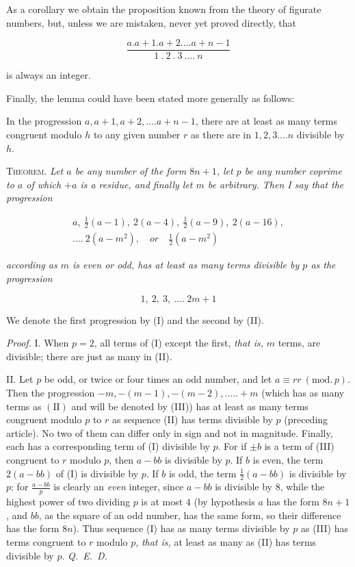 As a corollary we obtain the proposition known from the theory of figurate numbers, but, unless we are mistaken, never yet proved directly, that

\[
\frac{a.a+1.a+2....a+n-1}{1\ .\ 2\ .\ 3\ ....\ n}
\]

is always an integer.

Finally, the lemma could have been stated more generally as follows:

In the progression $a,a+1,a+2,....a+n-1$, there are at least as many terms congruent modulo $h$ to any given number $r$ as there are in $1,2,3....n$ divisible by $h$.

\textsc{Theorem.} \textit{Let $a$ be any number of the form $8n+1$, let $p$ be any number coprime to $a$ of which $+a$ is a residue, and finally let $m$ be arbitrary. Then I say that the progression}

\[
\begin{gathered}a,\ \tfrac12(a-1),\ 2(a-4),\ \tfrac12(a-9),\ 2(a-16),\\ ....\ 2(a-m^2),\quad\textit{or}\quad\tfrac12(a-m^2)\end{gathered}
\]

\textit{according as $m$ is even or odd, has at least as many terms divisible by $p$ as the progression}

\[
1,\ 2,\ 3,\ ....\ 2m+1
\]

We denote the first progression by (I) and the second by (II).

\textit{Proof.} I. When $p=2$, all terms of (I) except the first, \textit{that is,} $m$ terms, are divisible; there are just as many in (II).

II. Let $p$ be odd, or twice or four times an odd number, and let $a\equiv rr\ (\mathrm{mod.}\,p)$. Then the progression $-m,-(m-1),-(m-2),.....+m$ (which has as many terms as $(\mathrm{II})$ and will be denoted by (III)) has at least as many terms congruent modulo $p$ to $r$ as sequence (II) has terms divisible by $p$ (preceding article). No two of them can differ only in sign and not in magnitude. Finally, each has a corresponding term of (I) divisible by $p$. For if $\pm b$ is a term of (III) congruent to $r$ modulo $p$, then $a-bb$ is divisible by $p$. If $b$ is even, the term $2(a-bb)$ of (I) is divisible by $p$. If $b$ is odd, the term $\frac12(a-bb)$ is divisible by $p$: for $\frac{a-bb}{p}$ is clearly an \textit{even} integer, since $a-bb$ is divisible by $8$, while the highest power of two dividing $p$ is at most $4$ (by hypothesis $a$ has the form $8n+1$, and $bb$, as the square of an odd number, has the same form, so their difference has the form $8n$). Thus sequence (I) has as many terms divisible by $p$ as (III) has terms congruent to $r$ modulo $p$, \textit{that is,} at least as many as (II) has terms divisible by $p$. \mbox{\textit{Q. E. D.}}

